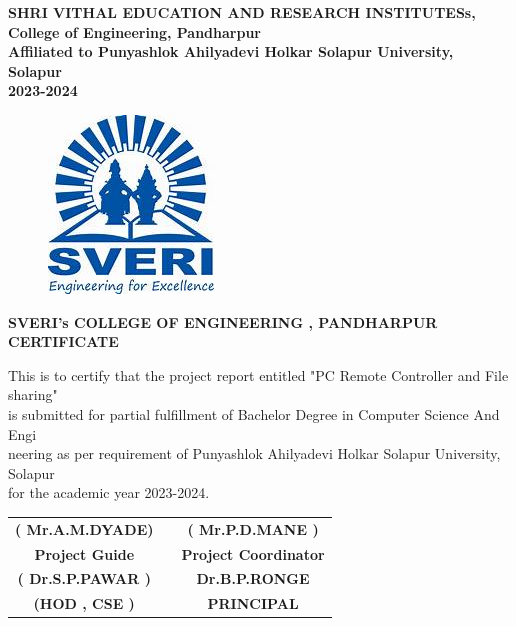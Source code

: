 \documentclass[12pt]{article}
\begin{document}
\begin{center}
\textbf{SHRI VITHAL EDUCATION AND RESEARCH INSTITUTESs,\\[2mm]
College of Engineering, Pandharpur\\[3mm]
Affiliated to Punyashlok Ahilyadevi Holkar Solapur University, Solapur\\[2mm]
2023-2024}
\end{center}  
 
\clearpage


\begin{figure}[h]
 \centering
 \includegraphics[scale=1]{sveri2logo}
\end{figure}

\begin{center}
 \large \textbf { SVERI's COLLEGE OF ENGINEERING , PANDHARPUR }\\[7mm]
 \textbf{CERTIFICATE}\\[7mm]
 \end{center} 
 This is to certify that the project report entitled "PC Remote Controller and File sharing"\\[2mm] is submitted for partial fulfillment of Bachelor Degree in Computer Science And Engi\\[2mm]neering as per requirement of Punyashlok Ahilyadevi Holkar Solapur University, Solapur\\[2mm] for the academic year 2023-2024.\\[30mm] 
 

 
 \begin{tabular}{ c c c } 
 \textbf{( Mr.A.M.DYADE)} & \hspace{2.0in} & \textbf{( Mr.P.D.MANE )} \\ [1mm] 
 \textbf {Project Guide} & \hspace{2.0in} & \textbf{Project Coordinator}\\[30mm]
 \textbf{( Dr.S.P.PAWAR )} & \hspace{2.0in}  & \textbf{Dr.B.P.RONGE}\\[1mm]
 \textbf{(HOD , CSE )} & \hspace{2.0in}  & \textbf{ PRINCIPAL }\\[30mm]
 \end{tabular}
 
\end{document}

